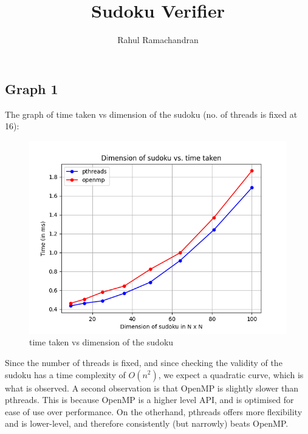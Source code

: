 \documentclass[12pt]{article}
\begin{document}
\title{
	Sudoku Verifier
}
\author{ Rahul Ramachandran%
}

\date{\vspace{-4ex}}

\maketitle




\subsection{Graph 1}
The graph of time taken vs dimension of the sudoku (no. of threads is fixed at 16):
\begin{figure}[H]
    \centering
    \includegraphics[width=\columnwidth]{Figure_1.png}
    \caption{time taken vs dimension of the sudoku}
    \label{fig-1}
  \end{figure}

Since the number of threads is fixed, and since checking the validity of the sudoku has a 
time complexity of $O(n^2)$, we expect a quadratic curve, which is what is observed.
A second observation is that OpenMP is slightly slower than pthreads. This is because OpenMP
is a higher level API, and is optimised for ease of use over performance. On the otherhand, pthreads
offers more flexibility and is lower-level, and therefore consistently (but narrowly) beats OpenMP.
\end{document}
